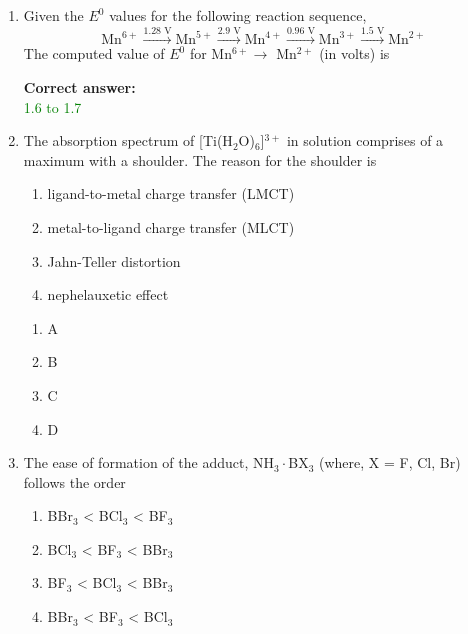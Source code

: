 \documentclass[journal,12pt,onecolumn]{exam}
\theoremstyle{remark}
\newcommand{\correct}{\textcolor{correctgreen}{\checkmark}}
\newcommand{\wrong}{\textcolor{wrongred}{\ding{55}}} %
\begin{document}
\begin{enumerate}
\item 

Given the $E^0$ values for the following reaction sequence,
\[
\text{Mn}^{6+} \xrightarrow{1.28\text{ V}} \text{Mn}^{5+} \xrightarrow{2.9\text{ V}} \text{Mn}^{4+} \xrightarrow{0.96\text{ V}} \text{Mn}^{3+} \xrightarrow{1.5\text{ V}} \text{Mn}^{2+}
\]
The computed value of $E^0$ for Mn$^{6+} \rightarrow$ Mn$^{2+}$ (in volts) is \underline{\hspace{3cm}}

\hfill{}
 

\textbf{Correct answer:} \\
\textcolor{green}{1.6 to 1.7}

 

\item 
The absorption spectrum of [Ti(H$_2$O)$_6$]$^{3+}$ in solution comprises of a maximum with a shoulder. The reason for the shoulder is

\begin{enumerate}
    \item ligand-to-metal charge transfer (LMCT)
    \item metal-to-ligand charge transfer (MLCT)
    \item Jahn-Teller distortion
    \item nephelauxetic effect
\end{enumerate}

\hfill{}

 

\begin{multicols}{2}
\begin{enumerate}
    \item \wrong A
    \item \wrong B
    \item \correct C
    \item \wrong D
\end{enumerate}
\end{multicols}

 

\item 
The ease of formation of the adduct, NH$_3\cdot$BX$_3$ (where, X = F, Cl, Br) follows the order

\begin{enumerate}
    \item BBr$_3$ < BCl$_3$ < BF$_3$
    \item BCl$_3$ < BF$_3$ < BBr$_3$
    \item BF$_3$ < BCl$_3$ < BBr$_3$
    \item BBr$_3$ < BF$_3$ < BCl$_3$
\end{enumerate}


\end{enumerate}
\end{document}
